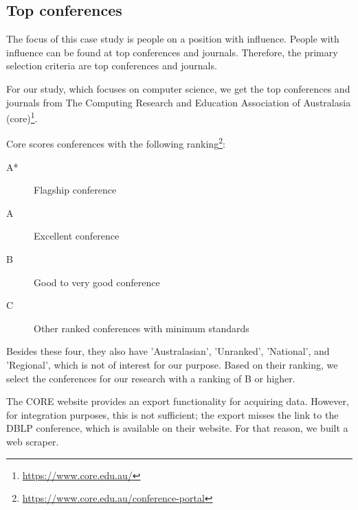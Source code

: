 \documentclass{ou-report}
\newcommand{\dblp}{DBLP}
\newcommand{\api}{API}
\begin{document}
\subsection{Top conferences}
The focus of this case study is people on a position with influence.
People with influence can be found at top conferences and journals.
Therefore, the primary selection criteria are top conferences and journals.


For our study, which focuses on computer science, we get the top conferences 
and journals from The Computing Research and Education Association of 
Australasia (core)\footnote{\url{https://www.core.edu.au/}}.

Core scores conferences with the following
ranking\footnote{\url{https://www.core.edu.au/conference-portal}}:
\begin{description}
    \item[A*] Flagship conference
    \item[A] Excellent conference
    \item[B] Good to very good conference
    \item[C] Other ranked conferences with minimum standards
\end{description}
Besides these four, they also have 'Australasian', 'Unranked', 'National', and 
'Regional', which is not of interest for our purpose.
Based on their ranking, we select the conferences for our 
research with a ranking of B or higher.

The CORE website provides an export functionality for acquiring data. However, 
for integration purposes, this is not sufficient; the export misses the link to 
the \dblp{} conference, which is available on their website. For that reason, we 
built a web scraper.
\end{document}
